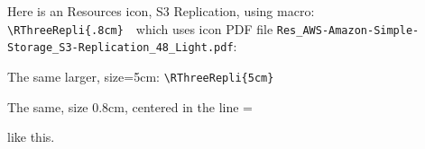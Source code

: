 \documentclass[12pt]{article}
\newcommand{\vcenteredinclude}[1]{\begingroup
\setbox0=\hbox{#1}%
\parbox{\wd0}{\box0}\endgroup}
\begin{document}



\vspace{3cm}

Here is an Resources icon, S3 Replication, using macro: \texttt{{\textbackslash}RThreeRepli\{.8cm\}}\ \  which uses icon PDF file \texttt{Res\_AWS-Amazon-Simple-Storage\_S3-Replication\_48\_Light.pdf}:
\RSThreeRepli{.8cm}

\vspace{2cm}
The same larger, size=5cm: \texttt{{\textbackslash}RThreeRepli\{5cm\}}\ \ \RSThreeRepli{5cm}

\vspace{1cm}
The same, size 0.8cm, centered in the line \vcenteredinclude{\RSThreeRepli{.8cm}} like this.
\end{document}
